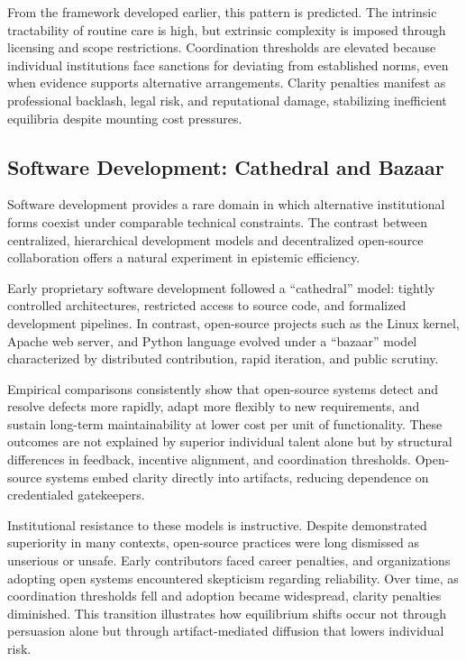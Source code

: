 \documentclass[11pt]{article}
\begin{document}
From the framework developed earlier, this pattern is predicted. The intrinsic tractability of routine care is high, but extrinsic complexity is imposed through licensing and scope restrictions. Coordination thresholds are elevated because individual institutions face sanctions for deviating from established norms, even when evidence supports alternative arrangements. Clarity penalties manifest as professional backlash, legal risk, and reputational damage, stabilizing inefficient equilibria despite mounting cost pressures.

\subsection{Software Development: Cathedral and Bazaar}

Software development provides a rare domain in which alternative institutional forms coexist under comparable technical constraints. The contrast between centralized, hierarchical development models and decentralized open-source collaboration offers a natural experiment in epistemic efficiency.

Early proprietary software development followed a “cathedral” model: tightly controlled architectures, restricted access to source code, and formalized development pipelines. In contrast, open-source projects such as the Linux kernel, Apache web server, and Python language evolved under a “bazaar” model characterized by distributed contribution, rapid iteration, and public scrutiny.

Empirical comparisons consistently show that open-source systems detect and resolve defects more rapidly, adapt more flexibly to new requirements, and sustain long-term maintainability at lower cost per unit of functionality. These outcomes are not explained by superior individual talent alone but by structural differences in feedback, incentive alignment, and coordination thresholds. Open-source systems embed clarity directly into artifacts, reducing dependence on credentialed gatekeepers.

Institutional resistance to these models is instructive. Despite demonstrated superiority in many contexts, open-source practices were long dismissed as unserious or unsafe. Early contributors faced career penalties, and organizations adopting open systems encountered skepticism regarding reliability. Over time, as coordination thresholds fell and adoption became widespread, clarity penalties diminished. This transition illustrates how equilibrium shifts occur not through persuasion alone but through artifact-mediated diffusion that lowers individual risk.
\end{document}
